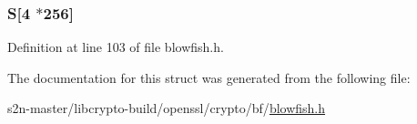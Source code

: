 \subsubsection[{\texorpdfstring{S}{S}}]{ S\mbox{[}4 $\ast$256\mbox{]}}\hypertarget{structbf__key__st_a9731ab66322e7186b7cbffa6dc0d6d8f}{}\label{structbf__key__st_a9731ab66322e7186b7cbffa6dc0d6d8f}


Definition at line 103 of file blowfish.\+h.



The documentation for this struct was generated from the following file\+:\begin{DoxyCompactItemize}
\item 
s2n-\/master/libcrypto-\/build/openssl/crypto/bf/\hyperlink{blowfish_8h}{blowfish.\+h}\end{DoxyCompactItemize}
